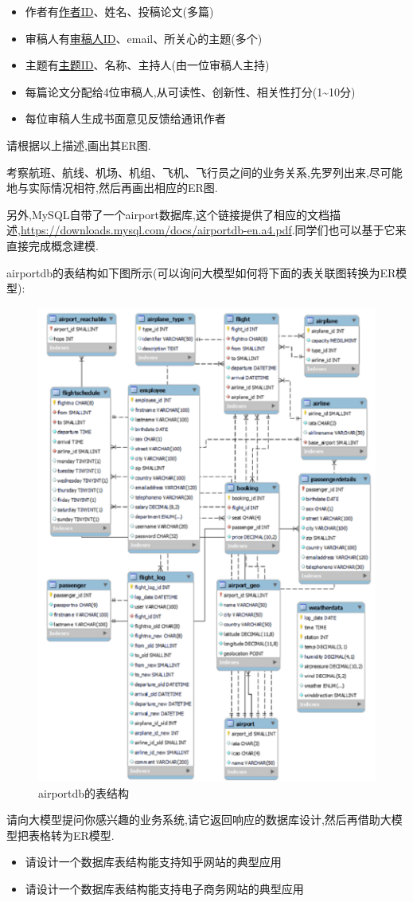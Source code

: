 \begin{problemset}
\begin{itemize}
    \item 作者有{\underline{作者ID}}、姓名、投稿论文(多篇)
    \item 审稿人有{\underline{审稿人ID}}、email、所关心的主题(多个)
    \item 主题有{\underline{主题ID}}、名称、主持人(由一位审稿人主持)
    \item 每篇论文分配给4位审稿人,从可读性、创新性、相关性打分(1\~{}10分)
    \item 每位审稿人生成书面意见反馈给通讯作者
  \end{itemize}
  请根据以上描述,画出其ER图.
  \item 考察航班、航线、机场、机组、飞机、飞行员之间的业务关系,先罗列出来,尽可能地与实际情况相符,然后再画出相应的ER图.
  
  另外,MySQL自带了一个airport数据库,这个链接提供了相应的文档描述,\url{https://downloads.mysql.com/docs/airportdb-en.a4.pdf}.同学们也可以基于它来直接完成概念建模.
  
  airportdb的表结构如下图所示(可以询问大模型如何将下面的表关联图转换为ER模型):
  \begin{figure}[H]
      \centering
      \includegraphics[width=.5\textwidth]{figure/第2章-7.pdf}
      \caption{airportdb的表结构}
  \end{figure}
  \item 请向大模型提问你感兴趣的业务系统,请它返回响应的数据库设计,然后再借助大模型把表格转为ER模型.
  \begin{itemize}
    \item 请设计一个数据库表结构能支持知乎网站的典型应用
    \item 请设计一个数据库表结构能支持电子商务网站的典型应用
  \end{itemize}
\end{problemset}

